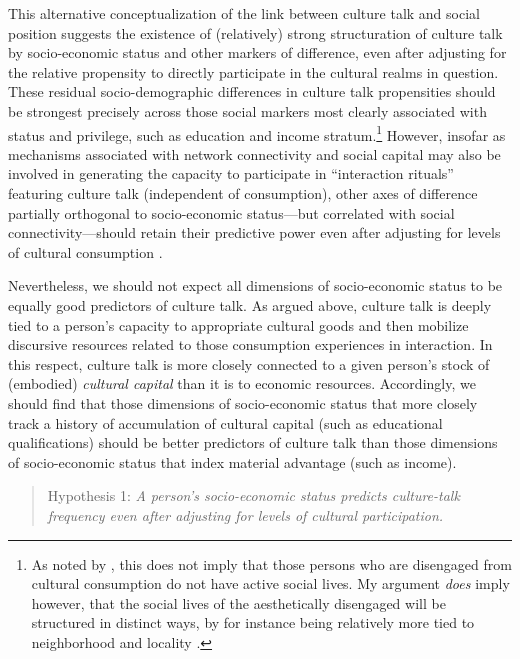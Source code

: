 This alternative conceptualization of the link between culture talk and social position suggests the existence of (relatively) strong structuration of culture talk by socio-economic status and other markers of difference, even after adjusting for the relative propensity to directly participate in the cultural realms in question.  These residual socio-demographic differences in culture talk propensities should be strongest precisely across those social markers most clearly associated with status and privilege, such as education and income stratum.\footnote{As noted by \citet{bennett_etal08}, this does not imply that those persons who are disengaged from cultural consumption do not have active social lives. My argument \emph{does} imply however, that the social lives of the aesthetically disengaged will be structured in distinct ways, by for instance being relatively more tied to neighborhood and locality \cite{prieur_savage11}.}   However, insofar as mechanisms associated with network connectivity and social capital may also be involved in generating the capacity to participate in ``interaction rituals''  featuring culture talk (independent of consumption), other axes of difference partially orthogonal to socio-economic status---but correlated with social connectivity---should retain their predictive power even after adjusting for levels of cultural consumption \citep{collins04}. 

Nevertheless, we should not expect all dimensions of socio-economic status to be equally good predictors of culture talk. As argued above, culture talk is deeply tied to a person's capacity to appropriate cultural goods and then mobilize discursive resources related to those consumption experiences in interaction. In this respect, culture talk is more closely connected to a given person's stock of (embodied) \emph{cultural capital} than it is to economic resources. Accordingly, we should find that those dimensions of socio-economic status that more closely track a history of accumulation of cultural capital (such as educational qualifications) should be better predictors of culture talk than those dimensions of socio-economic status that index material advantage (such as income).

\begin{quote}
Hypothesis 1:  \emph{A person's socio-economic status predicts culture-talk  frequency even after adjusting for levels of cultural participation.}
\end{quote}

